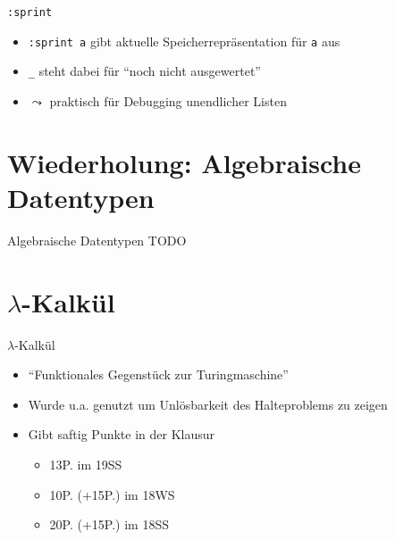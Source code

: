 \documentclass{beamer}
\begin{document}
\begin{frame}{\texttt{:sprint}}

	\begin{itemize}
		\item \texttt{:sprint a} gibt aktuelle Speicherrepräsentation für \texttt{a} aus
		\item \texttt{\_} steht dabei für \enquote{noch nicht ausgewertet}
		\item $\leadsto$ praktisch für Debugging unendlicher Listen
	\end{itemize}
\end{frame}

\section{Wiederholung: Algebraische Datentypen}

\begin{frame}{Algebraische Datentypen}
  TODO
\end{frame}

\section{$\lambda$-Kalkül}

\begin{frame}{$\lambda$-Kalkül}
	\begin{itemize}
                \item \enquote{Funktionales Gegenstück zur Turingmaschine}
		\item Wurde u.a. genutzt um Unlösbarkeit des Halteproblems zu zeigen
		\item Gibt saftig Punkte in der Klausur
		\begin{itemize}
			\item 13P. im 19SS
			\item 10P. (+15P.) im 18WS
			\item 20P. (+15P.) im 18SS
		\end{itemize}
	\end{itemize}
\end{frame}
\end{document}
